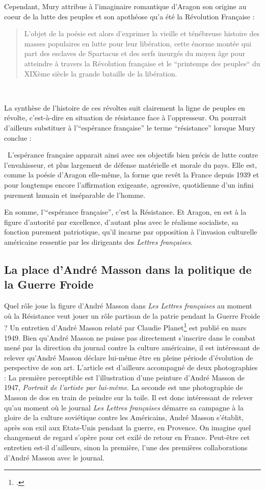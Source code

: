 Cependant, Mury attribue à l’imaginaire romantique d’Aragon son origine au coeur de la lutte des peuples et son apothéose qu’a été la Révolution Française : 

\begin{quote}
 L’objet de la poésie est alors d’exprimer la vieille et ténébreuse histoire des masses populaires en lutte pour leur libération, cette énorme montée qui part des esclaves de Spartacus et des serfs insurgés du moyen âge pour atteindre à travers la Révolution française et le “printemps des peuples“ du XIXème siècle la grande bataille de la libération.   
\end{quote} 

 La synthèse de l’histoire de ces révoltes suit clairement la ligne de peuples en révolte, c’est-à-dire en situation de résistance face à l’oppresseur. On pourrait d’ailleurs substituer à l’\enquote{espérance française} le terme \enquote{résistance} lorsque Mury conclue : 

 L’espérance française apparait ainsi avec ses objectifs bien précis de lutte contre l’envahisseur, et plus largement de défense matérielle et morale du pays. Elle est, comme la poésie d’Aragon elle-même, la forme que revêt la France depuis 1939 et pour longtemps encore l’affirmation exigeante, agressive, quotidienne d’un infini purement humain et inséparable de l’homme.

	 En somme, l’\enquote{espérance française}, c’est la Résistance. Et Aragon, en est à la figure d’autorité par excellence, d’autant plus avec le réalisme socialiste, sa fonction purement patriotique, qu’il incarne par opposition à l’invasion culturelle américaine ressentie par les dirigeants des \emph{Lettres françaises}. 
\subsection{La place d'André Masson dans la politique de la Guerre Froide}

     Quel rôle joue la figure d’André Masson dans \emph{Les Lettres françaises} au moment où la Résistance veut jouer un rôle partisan de la patrie pendant la Guerre Froide ? Un entretien d’André Masson relaté par Claudie Planet\footcite{entretienmasson} est publié en mars 1949. Bien qu’André Masson ne puisse pas directement s’inscrire dans le combat mené par la direction du journal contre la culture américaine, il est intéressant de relever qu’André Masson déclare lui-même être en pleine période d’évolution de perspective de son art. L’article est d’ailleurs accompagné de deux photographies : La première perceptible est l’illustration d’une peinture d’André Masson de 1947, \emph{Portrait de l’artiste par lui-même}. La seconde est une photographie de Masson de dos en train de peindre sur la toile. Il est donc intéressant de relever qu’au moment où le journal \emph{Les Lettres françaises} démarre sa campagne à la gloire de la culture soviétique contre les Américains, André Masson s’établit, après son exil aux Etats-Unis pendant la guerre, en Provence. On imagine quel changement de regard s’opère pour cet exilé de retour en France. Peut-être cet entretien est-il d’ailleurs, sinon la première, l’une des premières collaborations d’André Masson avec le journal.
	 

